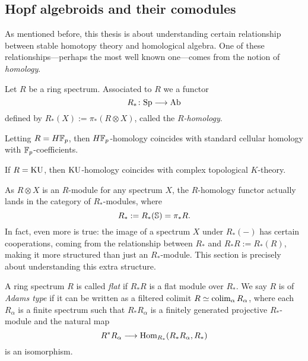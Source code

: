 

\subsection{Hopf algebroids and their comodules}
\label{ch0:ssec:hopf-algebroids-and-their-comodules}

As mentioned before, this thesis is about understanding certain relationship between stable homotopy theory and homological algebra. One of these relationships---perhaps the most well known one---comes from the notion of \emph{homology}. 

\begin{definition}
    Let $R$ be a ring spectrum. Associated to $R$ we a functor
    \[R_* \: \Sp \to \Ab\]
    defined by $R_*(X):= \pi_*(R\otimes X)$, called the \emph{$R$-homology}. 
\end{definition}

\begin{example}
    Letting $R = H\F_p$, then $H\F_p$-homology coincides with standard cellular homology with $\F_p$-coefficients. 
\end{example}

\begin{example}
    If $R=\KU$, then $\KU$-homology coincides with complex topological $K$-theory. 
\end{example}

As $R\otimes X$ is an $R$-module for any spectrum $X$, the $R$-homology functor actually lands in the category of $R_*$-modules, where 
\[R_*:= R_*(\S) = \pi_* R.\] 
In fact, even more is true: the image of a spectrum $X$ under $R_*(-)$ has certain cooperations, coming from the relationship between $R_*$ and $R_*R:= R_*(R)$, making it more structured than just an $R_*$-module. This section is precisely about understanding this extra structure. 

\begin{definition}
    \label{ch0:def:flat-and-adams-type-ring}
    A ring spectrum $R$ is called \emph{flat} if $R_*R$ is a flat module over $R_*$. We say $R$ is of \emph{Adams type} if it can be written as a filtered colimit $R\simeq \colim_\alpha R_\alpha$, where each $R_\alpha$ is a finite spectrum such that $R_*R_\alpha$ is a finitely generated projective $R_*$-module and the natural map 
    \[R^*R_\alpha \longrightarrow \Hom_{R_*}(R_*R_\alpha, R_*)\] 
    is an isomorphism.
\end{definition}

